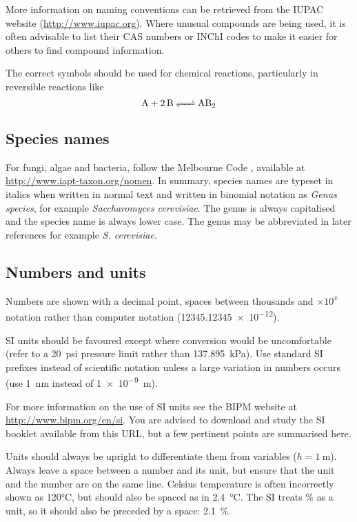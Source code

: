 \documentclass[a5paper, 10pt]{article}
\begin{document}
More information on naming conventions can be retrieved from the IUPAC
website (\url{http://www.iupac.org}).  Where unusual compounds are being used, it is often advisable to list their CAS numbers or INChI codes to make it easier for others to find compound information.

The correct symbols should be used for chemical reactions,
particularly in reversible reactions like
\begin{displaymath}
  \ce{A + 2B <=> AB2}
\end{displaymath}

\subsection{Species names}
For fungi, algae and bacteria, follow the Melbourne Code \citep{mcneill2012international}, available at
\url{http://www.iapt-taxon.org/nomen}. In summary, species names are typeset in
italics when written in normal text and written in binomial notation as
\textit{Genus species}, for example \textit{Saccharomyces cerevisiae}. The genus
is always capitalised and the species name is
always lower case. The genus may be abbreviated in later references for example
\textit{S. cerevisiae}.

\subsection{Numbers and units}
Numbers are shown with a decimal point, spaces between thousands and $\times 10^x$ notation rather than computer notation (\num{12345.12345e-12}).

SI units should be favoured except where conversion would be
uncomfortable (refer to a \SI{20}{psi} pressure limit rather than
\SI{137.895}{\kilo\pascal}).
Use standard
SI prefixes instead of scientific notation unless a large variation in
numbers occurs (use \SI{1}{\nano\meter} instead of \SI{1e-9}{\meter}).

For more information on the use of SI units see the BIPM website at \url{http://www.bipm.org/en/si}.  You are advised to download and study the SI booklet available from this URL, but a few pertinent points are summarised here.

Units should always be upright to differentiate them from variables ($h = \SI{1}{\meter}$).  
Always leave a space between a number and its
unit, but ensure that the unit and the number are on the same line.  
Celsius temperature is
often incorrectly shown as 120\si{\celsius}, but should also be spaced
as in \SI{2.4}{\celsius}.  The SI treats \% as a unit, so it should also be preceded by a space: \SI{2.1}{\%}.
\end{document}
